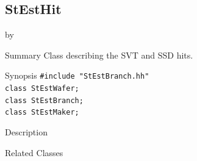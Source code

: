 \documentclass[twoside]{article}
\newcommand{\entrylabel}[1]{\mbox{\textbf{{#1}}}\hfil}%
\newenvironment{entry}
{\begin{list}{}%
    {\renewcommand{\makelabel}{\entrylabel}%
     \setlength{\labelwidth}{90pt}%
     \setlength{\leftmargin}{\labelwidth}
     \advance\leftmargin by \labelsep%
      }%
    }%
  {\end{list}}
\newcommand{\Entrylabel}[1]%
{\raisebox{0pt}[1ex][0pt]{\makebox[\labelwidth][l]%
    {\parbox[t]{\labelwidth}{\hspace{0pt}\textbf{{#1}}}}}}
\newenvironment{Entry}%
{\renewcommand{\entrylabel}{\Entrylabel}\begin{entry}}%
  {\end{entry}}
\begin{document}
%
%
\subsection{StEstHit}
\label{sec:StestHitq}
\begin{Entry}
\item[Summary]
Class describing the SVT and SSD hits.\\
\item[Synopsis]
    \verb+#include "StEstBranch.hh"+\\
    \verb+class StEstWafer;+\\
    \verb+class StEstBranch;+\\
    \verb+class StEstMaker;+\\
\item[Description]

\item[Related Classes]
	

\end{Entry}
\end{document}
